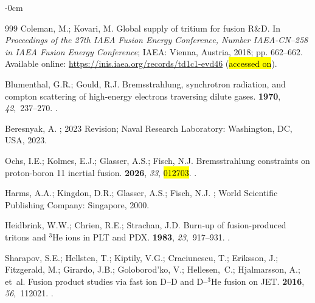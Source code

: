 \documentclass[particles,article,accept,pdftex,moreauthors]{Definitions/mdpi}
\begin{document}
\begin{adjustwidth}{-\extralength}{0cm}
\begin{thebibliography}{999}
Coleman, M.; Kovari, M.
\newblock Global supply of tritium for fusion R\&D.
\newblock In \emph{Proceedings of the 27th IAEA Fusion Energy Conference,
  Number IAEA-CN--258 in IAEA Fusion Energy Conference}; IAEA: Vienna, Austria, 2018; pp. 662--662.
\newblock Available online:  \url{https://inis.iaea.org/records/td1c1-evd46} (\hl{accessed on}).





Blumenthal, G.R.; Gould, R.J.
\newblock Bremsstrahlung, synchrotron radiation, and compton scattering of
  high-energy electrons traversing dilute gases.
 {\bf 1970}, {\em 42},~237--270.
.

Beresnyak, A.
; 2023 Revision; Naval Research Laboratory: Washington,
  DC,  USA, 2023.

Ochs, I.E.; Kolmes, E.J.;  Glasser, A.S.; Fisch, N.J.
\newblock Bremsstrahlung constraints on proton-boron 11 inertial fusion.
 {\bf 2026}, {\em 33}, \hl{012703}.
.

Harms, A.A.; Kingdon, D.R.;  Glasser, A.S.; Fisch, N.J.
; World Scientific Publishing
  Company: Singapore,  2000.

Heidbrink, W.W.; Chrien, R.E.;  Strachan, J.D.
\newblock Burn-up of fusion-produced tritons and {}$^3$He ions in {PLT} and
  {PDX}.
 {\bf 1983}, {\em 23},~917--931.
.

Sharapov, S.E.; Hellsten, T.;  Kiptily, V.G.; Craciunescu, T.; Eriksson, J.; Fitzgerald, M.; Girardo, J.B.; Goloborod’ko, V.; Hellesen,~C.; Hjalmarsson, A.; et~al.
\newblock Fusion product studies via fast ion {D--D} and {D--}$^3$He fusion on
  {JET}.
 {\bf 2016}, {\em 56},~112021.
.


\end{thebibliography}
\end{adjustwidth}
\end{document}
